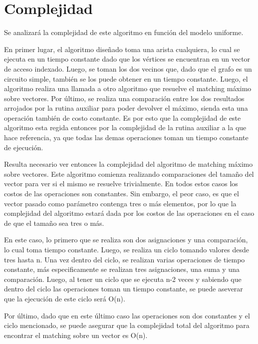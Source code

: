 \documentclass[a4paper, 12pt]{article}
\begin{document}
\section*{Complejidad}

Se analizar\'a la complejidad de este algoritmo en funci\'on del modelo uniforme.

En primer lugar, el algoritmo dise\~{n}ado toma una arista cualquiera, lo cual se ejecuta en un tiempo constante dado que los v\'ertices se encuentran en un vector de acceso indexado. Luego, se toman los dos vecinos que, dado que el grafo es un circuito simple, tambi\'en se los puede obtener en un tiempo constante. Luego, el algoritmo realiza una llamada a otro algoritmo que resuelve el matching m\'aximo sobre vectores. Por \'ultimo, se realiza una comparaci\'on entre los dos resultados arrojados por la rutina auxiliar para poder devolver el m\'aximo, sienda esta una operaci\'on tambi\'en de costo constante. Es por esto que la complejidad de este algoritmo esta regida entonces por la complejidad de la rutina auxiliar a la que hace referencia, ya que todas las demas operaciones toman un tiempo constante de ejecuci\'on.

Resulta necesario ver entonces la complejidad del algoritmo de matching m\'aximo sobre vectores.
Este algoritmo comienza realizando comparaciones del tama\~{n}o del vector para ver si el mismo se resuelve trivialmente. En todos estos casos los costos de las operaciones son constantes. Sin embargo, el peor caso, es que el vector pasado como par\'ametro contenga tres o m\'as elementos, por lo que la complejidad del algoritmo estar\'a dada por los costos de las operaciones en el caso de que el tama\~{n}o sea tres o m\'as.

En este caso, lo primero que se realiza son dos asignaciones y una comparaci\'on, lo cual toma tiempo constante. Luego, se realiza un ciclo tomando valores desde tres hasta n. Una vez dentro del ciclo, se realizan varias operaciones de tiempo constante, m\'as especificamente se realizan tres asignaciones, una suma y una comparaci\'on. Luego, al tener un ciclo que se ejecuta n-2 veces y sabiendo que dentro del ciclo las operaciones toman un tiempo constante, se puede aseverar que la ejecuci\'on de este ciclo ser\'a O(n). 

Por \'ultimo, dado que en este \'ultimo caso las operaciones son dos constantes y el ciclo mencionado, se puede asegurar que la complejidad total del algoritmo para encontrar el matching sobre un vector es O(n).
\end{document}

